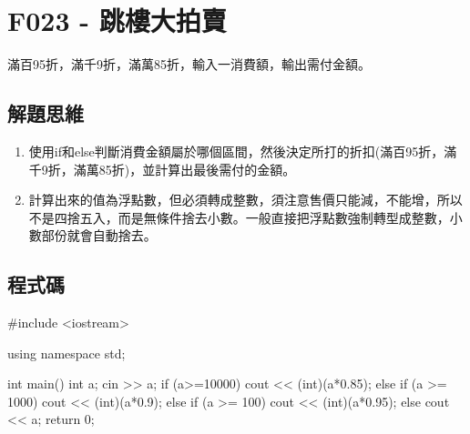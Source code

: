 \section{F023 - 跳樓大拍賣}
滿百95折，滿千9折，滿萬85折，輸入一消費額，輸出需付金額。

\subsection{解題思維}
\begin{enumerate}
	\item 使用if和else判斷消費金額屬於哪個區間，然後決定所打的折扣(滿百95折，滿千9折，滿萬85折)，並計算出最後需付的金額。
	\item 計算出來的值為浮點數，但必須轉成整數，須注意售價只能減，不能增，所以不是四捨五入，而是無條件捨去小數。一般直接把浮點數強制轉型成整數，小數部份就會自動捨去。
\end{enumerate}
\subsection{程式碼}
\begin{cppcode}
	#include <iostream>
	
	using namespace std;
	
	int main()
	{
		int a;
		cin >> a;
		if (a>=10000) cout << (int)(a*0.85);
		else if (a >= 1000) cout << (int)(a*0.9);
		else if (a >= 100) cout << (int)(a*0.95);
		else cout << a;
		return 0;
	}	
\end{cppcode}
